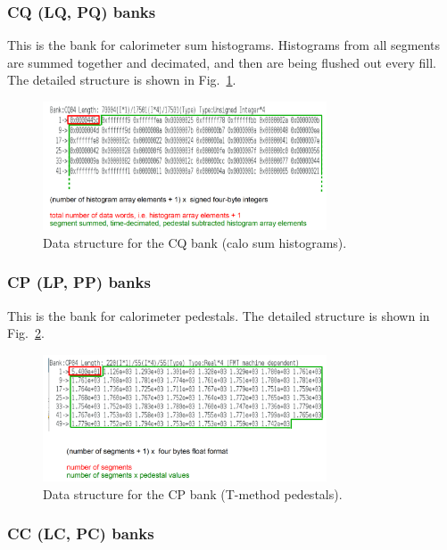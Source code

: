 \subsubsection*{CQ (LQ, PQ) banks}

This is the bank for calorimeter sum histograms. Histograms from all segments are summed together and decimated, and then are being flushed out every fill. The detailed structure is shown in Fig.~\ref{fig:CQBankFormat}.

\begin{figure}[htbp]
\centering
\includegraphics[width=0.75\textwidth]{pics/CQBankFormat.pdf} 
\caption{Data structure for the CQ bank (calo sum histograms).}\label{fig:CQBankFormat}
\end{figure}

\subsubsection*{CP (LP, PP) banks}

This is the bank for calorimeter pedestals. The detailed structure is shown in Fig.~\ref{fig:CPBankFormat}.

\begin{figure}[htbp]
\centering
\includegraphics[width=0.75\textwidth]{pics/CPBankFormat.pdf} 
\caption{Data structure for the CP bank (T-method pedestals).}\label{fig:CPBankFormat}
\end{figure}

\subsubsection*{CC (LC, PC) banks}

